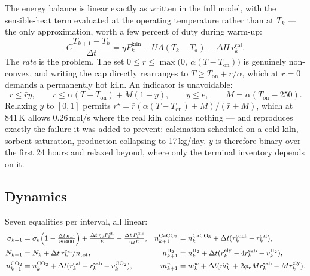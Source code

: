 \documentclass[11pt,a4paper]{article}
\begin{document}
The energy balance is linear exactly as written in the full model, with the
sensible-heat term evaluated at the operating temperature rather than at $T_k$
--- the only approximation, worth a few percent of duty during warm-up:
\begin{equation}
C\frac{T_{k+1}-T_k}{\Delta t} = \eta P^{\text{kiln}}_k - UA(T_k - T_a) - \Delta H\,r^{\text{cal}}_k .
\end{equation}
The \emph{rate} is the problem. The set
$0 \le r \le \max\bigl(0,\ \alpha(T-T_{\text{on}})\bigr)$ is genuinely
non-convex, and writing the cap directly rearranges to
$T \ge T_{\text{on}} + r/\alpha$, which at $r=0$ demands a permanently hot kiln.
An indicator is unavoidable:
\begin{equation}
r \le \bar r y, \qquad
r \le \alpha(T-T_{\text{on}}) + M(1-y), \qquad
y \le e, \qquad M = \alpha(T_{\text{on}}-250).
\end{equation}
Relaxing $y$ to $[0,1]$ permits
$r^\star = \bar r(\alpha(T-T_{\text{on}})+M)/(\bar r+M)$, which at 841\,K allows
$0.26$\,mol/s where the real kiln calcines nothing --- and reproduces exactly the
failure it was added to prevent: calcination scheduled on a cold kiln, sorbent
saturation, production collapsing to 17\,kg/day. $y$ is therefore binary over the
first 24 hours and relaxed beyond, where only the terminal inventory depends on
it.

\subsection{Dynamics}

Seven equalities per interval, all linear:
\begin{align}
\sigma_{k+1} &= \sigma_k\Bigl(1-\tfrac{\Delta t\,\kappa_{\text{sd}}}{86400}\Bigr)
  + \tfrac{\Delta t\,\eta_c P^{\text{ch}}_k}{E} - \tfrac{\Delta t\,P^{\text{dis}}_k}{\eta_d E}, &
n^{\mathrm{CaCO_3}}_{k+1} &= n^{\mathrm{CaCO_3}}_k + \Delta t(r^{\text{cont}}_k - r^{\text{cal}}_k),\\
\bar N_{k+1} &= \bar N_k + \Delta t\,r^{\text{cal}}_k/n_{\text{tot}}, &
n^{\mathrm{H_2}}_{k+1} &= n^{\mathrm{H_2}}_k + \Delta t(r^{\text{ely}}_k - 4r^{\text{sab}}_k - v^{\mathrm{H_2}}_k),\\
n^{\mathrm{CO_2}}_{k+1} &= n^{\mathrm{CO_2}}_k + \Delta t(r^{\text{cal}}_k - r^{\text{sab}}_k - v^{\mathrm{CO_2}}_k), &
m^w_{k+1} &= m^w_k + \Delta t(\dot m^w_k + 2\phi_r M r^{\text{sab}}_k - M r^{\text{ely}}_k).
\end{align}
\end{document}
